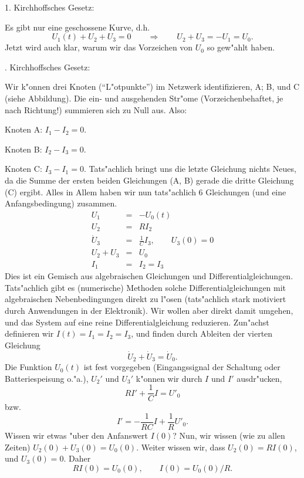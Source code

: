 1. Kirchhoffsches Gesetz:\par
Es gibt nur eine geschossene Kurve, d.h.
$$ U_1(t) +U_2+U_3 = 0\qquad\Rightarrow\qquad  U_2 + U_3 = -U_1 = U_0.$$
Jetzt wird auch klar, warum wir das Vorzeichen von $U_0$ so gew"ahlt haben.\par{}. Kirchhoffsches Gesetz:\par
Wir k"onnen drei Knoten (``L"otpunkte'') im Netzwerk identifizieren, A; B, und C (siehe Abbildung). 
Die ein- und ausgehenden Str"ome (Vorzeichenbehaftet, je nach Richtung!) summieren sich zu Null aus.
Also:\par
Knoten A:  $I_1 - I_2 = 0$.\par
Knoten B:  $I_2- I_3 = 0$.\par
Knoten C:  $I_3 - I_1 = 0$.
Tats"achlich bringt uns die letzte Gleichung nichts Neues, da die Summe der ersten beiden Gleichungen (A, B)
gerade die dritte Gleichung (C) ergibt. 
Alles in Allem haben wir nun tats"achlich 6 Gleichungen (und eine Anfangsbedingung) zusammen.
\begin{eqnarray*}
U_1 & = & - U_0(t)\\
U_2 & = & R I_2\\
\dot U_3 & = & \frac 1 C I_3,\qquad U_3(0) = 0\\
U_2+U_3 & = & U_0\\
I_1 & = & I_2 = I_3
\end{eqnarray*}
Dies ist ein Gemisch aus algebraischen Gleichungen und Differentialgleichungen. Tats"achlich gibt es (numerische)
Methoden solche Differentialgleichungen mit algebraischen Nebenbedingungen direkt zu l"osen (tats"achlich stark motiviert
durch Anwendungen in der Elektronik). Wir wollen aber direkt damit umgehen, und das System auf eine reine Differentialgleichung
reduzieren. Zun"achst definieren wir $I(t) =I_1=I_2=I_3$, und finden durch Ableiten der vierten Gleichung
$$ \dot U_2 + \dot U_3 = \dot U_0.$$
Die Funktion $U_0(t)$ ist fest vorgegeben (Eingangssignal der Schaltung oder Batteriespeisung o."a.), $U_2'$ und $U_3'$ k"onnen
wir durch $I$ und $I'$ ausdr"ucken,
$$ R I' + \frac 1 C I = U'_0$$
bzw.
$$  I'  = -  \frac 1{R C} I + \frac 1 R U'_0. $$
Wissen wir etwas "uber den Anfanswert $I(0)$? Nun, wir wissen (wie zu allen Zeiten) $U_2(0)+U_3(0) = U_0(0)$.
Weiter wissen wir, dass $U_2(0) = RI(0)$, und $U_3(0) = 0$. Daher
$$ RI(0) = U_0(0),\qquad I(0) = U_0(0)/R.$$


